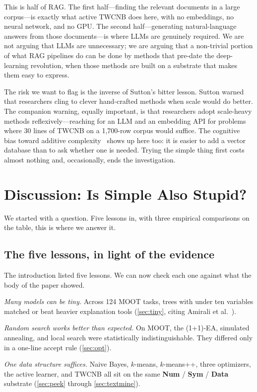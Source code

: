 \documentclass[AMA,STIX2COL]{WileyNJDv5}
\newcommand{\cls}[1]{%
  \setlength{\fboxsep}{1.5pt}%
  \colorbox{clsbg}{\sffamily\bfseries{#1}}%
}
\begin{document}
{This is half of RAG. The first half---finding the relevant
documents in a large corpus---is exactly what active TWCNB
does here, with no embeddings, no neural network, and no
GPU. The second half---generating natural-language answers
from those documents---is where LLMs are genuinely required.
We are not arguing that LLMs are unnecessary; we are arguing
that a non-trivial portion of what RAG pipelines do can be
done by methods that pre-date the deep-learning revolution,
when those methods are built on a substrate that makes them
easy to express.

The risk we want to flag is the inverse of Sutton's bitter
lesson. Sutton warned that researchers cling to clever
hand-crafted methods when scale would do better. The
companion warning, equally important, is that researchers
adopt scale-heavy methods reflexively---reaching for an LLM
and an embedding API for problems where 30 lines of TWCNB
on a 1{,}700-row corpus would suffice. The cognitive bias
toward additive complexity~\cite{Fillon25,adams2021people}
shows up here too: it is easier to add a vector database
than to ask whether one is needed. Trying the simple thing
first costs almost nothing and, occasionally, ends the
investigation.

\section{Discussion: Is Simple Also Stupid?}\label{sec:disc}

We started with a question. Five lessons in, with three
empirical comparisons on the table, this is where we answer it.

\subsection{The five lessons, in light of the evidence}

The introduction listed five lessons. We can now check each one
against what the body of the paper showed.

\textit{Many models can be tiny.} Across 124 MOOT tasks, trees
with under ten variables matched or beat heavier explanation
tools (\cref{sec:tiny}, citing Amirali et al.~\cite{amirali}).

\textit{Random search works better than expected.} On MOOT, the
(1+1)-EA, simulated annealing, and local search were
statistically indistinguishable. They differed only in a
one-line accept rule (\cref{sec:opt}).

\textit{One data structure suffices.} Naive Bayes, $k$-means,
$k$-means++, three optimizers, the active learner, and TWCNB
all sit on the same \cls{Num}/\cls{Sym}/\cls{Data} substrate
(\cref{sec:peek} through \cref{sec:textmine}).

}
\end{document}
